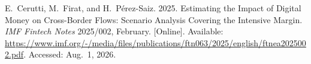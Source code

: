 {\begin{enumerate}[label={[\arabic*]}]





\item E.~Cerutti, M.~Firat, and H.~P\'{e}rez-Saiz. 2025. Estimating the Impact of Digital Money on Cross-Border Flows: Scenario Analysis Covering the Intensive Margin. \emph{IMF Fintech Notes} 2025/002, February. [Online]. Available: \url{https://www.imf.org/-/media/files/publications/ftn063/2025/english/ftnea2025002.pdf}. Accessed: Aug.~1, 2026.



\end{enumerate}}
